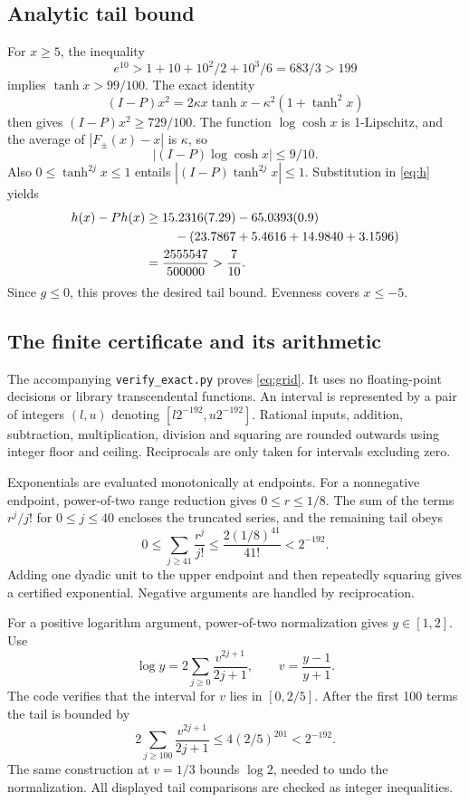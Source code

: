 \documentclass[11pt]{article}
\theoremstyle{remark}
\begin{document}
\subsection{Analytic tail bound}
For $x\ge5$, the inequality
\[
e^{10}>1+10+10^2/2+10^3/6=683/3>199
\]
implies $\tanh x>99/100$. The exact identity
\[
(I-P)x^2=2\kappa x\tanh x-\kappa^2(1+\tanh^2x)
\]
then gives $(I-P)x^2\ge729/100$. The function $\log\cosh x$ is 1-Lipschitz, and the average of $|F_\pm(x)-x|$ is $\kappa$, so
\[
|(I-P)\log\cosh x|\le9/10.
\]
Also $0\le\tanh^{2j}x\le1$ entails $|(I-P)\tanh^{2j}x|\le1$. Substitution in \eqref{eq:h} yields
\begin{align*}
h(x)-Ph(x)
&\ge15.2316(7.29)-65.0393(0.9)\\
&\hspace{8mm}-(23.7867+5.4616+14.9840+3.1596)\\
&=\frac{2555547}{500000}>\frac7{10}.
\end{align*}
Since $g\le0$, this proves the desired tail bound. Evenness covers $x\le-5$.

\subsection{The finite certificate and its arithmetic}
The accompanying \texttt{verify\_exact.py} proves \eqref{eq:grid}. It uses no floating-point decisions or library transcendental functions. An interval is represented by a pair of integers $(l,u)$ denoting $[l2^{-192},u2^{-192}]$. Rational inputs, addition, subtraction, multiplication, division and squaring are rounded outwards using integer floor and ceiling. Reciprocals are only taken for intervals excluding zero.

Exponentials are evaluated monotonically at endpoints. For a nonnegative endpoint, power-of-two range reduction gives $0\le r\le1/8$. The sum of the terms $r^j/j!$ for $0\le j\le40$ encloses the truncated series, and the remaining tail obeys
\[
0\le\sum_{j\ge41}\frac{r^j}{j!}
\le\frac{2(1/8)^{41}}{41!}<2^{-192}.
\]
Adding one dyadic unit to the upper endpoint and then repeatedly squaring gives a certified exponential. Negative arguments are handled by reciprocation.

For a positive logarithm argument, power-of-two normalization gives $y\in[1,2]$. Use
\[
\log y=2\sum_{j\ge0}\frac{v^{2j+1}}{2j+1},\qquad
v=\frac{y-1}{y+1}.
\]
The code verifies that the interval for $v$ lies in $[0,2/5]$. After the first 100 terms the tail is bounded by
\[
2\sum_{j\ge100}\frac{v^{2j+1}}{2j+1}
\le4(2/5)^{201}<2^{-192}.
\]
The same construction at $v=1/3$ bounds $\log2$, needed to undo the normalization. All displayed tail comparisons are checked as integer inequalities.
\end{document}
